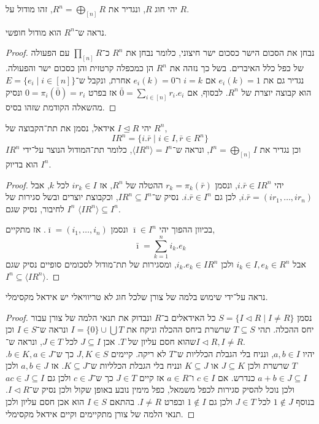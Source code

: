 \question{}
יהי חוג $R$, ונגדיר את $R^n = \bigoplus_{[n]} R$, זהו מודול על $R$.

\subquestion{}
נראה ש־$R^n$ הוא מודול חופשי.
\begin{proof}
	נבחן את הסכום הישר כסכום ישר חיצוני, כלומר נבחן את $R^n$ כ־$\prod_{[n]} R$ עם הפעולה של כפל כלל האיברים.
	בשל כך נזהה את $R^n$ הן כמכפלה קרטזית והן כסכום ישר והפעולה.
	נגדיר גם את $e_i(k) = 1$ אם $i = k$ ו־$e_i(k) = 0$ אחרת, ונקבל ש־$E = \{ e_i \mid i \in [n] \}$ הוא קבוצה יוצרת של $R^n$.
	לבסוף, אם $\bar{0} = \sum_{i \in [n]} r_i . e_i$ אז בפרט $0 = \pi_i(\bar{0}) = r_i$ ונסיק מהשאלה הקודמת שזהו בסיס.
\end{proof}

\subquestion{}
יהי $I \trianglelefteq R$ אידאל, נסמן את תת־הקבוצה של $R^n$,
\[
	I R^n
	= \{ i . \bar{r} \mid i \in I, \bar{r} \in R^n \}
\]
וכן נגדיר את $I^n = \bigoplus_{[n]} I$, ונראה ש־$\langle I R^n \rangle = I^n$, כלומר תת־המודול הנוצר על־ידי $I R^n$ הוא בדיוק $I^n$.
\begin{proof}
	יהי $i . \bar{r} \in I R^n$, ונסמן $r_k = \pi_k(\bar{r})$ ההטלה של $R^n$, אז $i r_k \in I$ לכל $k$, אבל $i . \bar{r} = (i r_1, \ldots, i r_n)$, לכן גם $i . \bar{r} \in I^n$.
	נסיק ש־$I R^n \subseteq I^n$, וכקבוצת יוצרים ובשל סגירות של $I^n$ לחיבור, נסיק שגם $\langle I R^n \rangle \subseteq I^n$.

	בכיוון ההפוך יהי $\bar{\imath} \in I^n$ ונסמן $\bar{\imath} = (i_1, \ldots, i_n)$.
	אז מתקיים,
	\[
		\bar{\imath}
		= \sum_{k = 1}^n i_k . e_k
	\]
	אבל $i_k \in I, e_k \in R^n$ ולכן $i_k . e_k \in I R^n$, ומסגירות של תת־מודול לסכומים סופיים נסיק שגם $I^n \subseteq \langle I R^n \rangle$.
\end{proof}

\subquestion{}
נראה על־ידי שימוש בלמה של צורן שלכל חוג לא טריוויאלי יש אידאל מקסימלי.
\begin{proof}
	נסמן $S = \{ I \triangleleft R \mid I \ne R \}$ כל האידאלים ב־$R$ ונבדוק את תנאי הלמה של צורן עבור יחס ההכלה.
	תהי $T \subseteq S$ שרשרת ביחס ההכלה וניקח את $I = \{ 0 \} \cup \bigcup T$ ונראה ש־$I \in S$ וכן שהוא חסם עליון של $T$.
	אכן $J \subseteq I$ לכל $J \in T$, ונראה ש־$I \triangleleft R, I \ne R$. \\
	יהיו $a, b \in I$, ונניח בלי הגבלת הכלליות ש־$T$ לא ריקה. קיימים $J, K \in S$ כך ש־$b \in K, a \in J$.
	$T$ שרשרת ולכן $J \subseteq K$ או $K \subseteq J$ ונניח בלי הגבלת הכלליות ש־$K \subseteq J$.
	אז $a, b \in J$ ולכן $a + b \in J \subseteq I$ כנדרש.
	אם $c \in I$ ו־$a \in R$ אז קיים $J \in T$ כך ש־$c \in J$ ולכן גם $a c \in J \subseteq I$ ולכן נוכל להסיק סגירות לכפל משמאל, כפל מימין נובע באופן שקול ולכן נסיק ש־$I \triangleleft R$.
	בנוסף $1 \notin J$ לכל $J \in T$ ולכן גם $1 \notin I$ ובפרט $I \ne R$.
	בהתאם $I \in S$ הוא אכן חסם עליון ולכן תנאי הלמה של צורן מתקיימים וקיים אידאל מקסימלי.
\end{proof}

